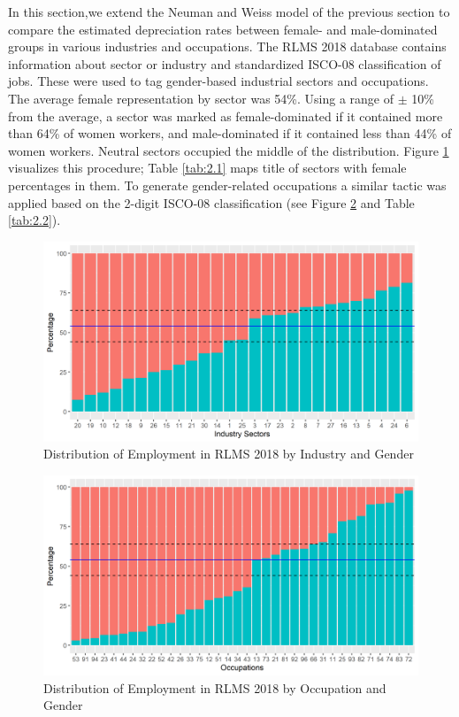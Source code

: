 \documentclass[alpha-refs]{wiley-article-02b}
\begin{document}
In this section,we extend the Neuman and Weiss model of the previous 
section to compare the estimated depreciation rates between female- and 
male-dominated groups in various industries and occupations. The RLMS 2018 
database contains information about sector or industry and standardized 
ISCO-08 classification of jobs. These were used  to tag gender-based 
industrial sectors and occupations. The average female 
representation by sector was 54\%.  Using a range of $\pm$ 10\% from the 
average, a sector was marked as female-dominated if it contained more than 
64\% of women workers, and male-dominated if it contained less than 44\% of 
women workers. Neutral sectors occupied the middle of the distribution. 
Figure \ref{fig:2.1} visualizes this procedure; Table \ref{tab:2.1} maps 
title of sectors with female percentages in them. To generate 
gender-related occupations a similar tactic was applied based on the 
2-digit ISCO-08 classification (see Figure \ref{fig:2.2} and Table 
\ref{tab:2.2}). 

\begin{figure}[htbp!]
	\centering
	\includegraphics[width=400pt]{gen_ind18.png}
	\caption{Distribution of Employment in RLMS 2018 by Industry and Gender}\label{fig:2.1}
\end{figure}

\begin{figure}[htbp!]
	\centering
	\includegraphics[width=400pt]{gen_occ18.png}
	\caption{Distribution of Employment in RLMS 2018 by Occupation and Gender}\label{fig:2.2}
\end{figure}
	
\end{document}
